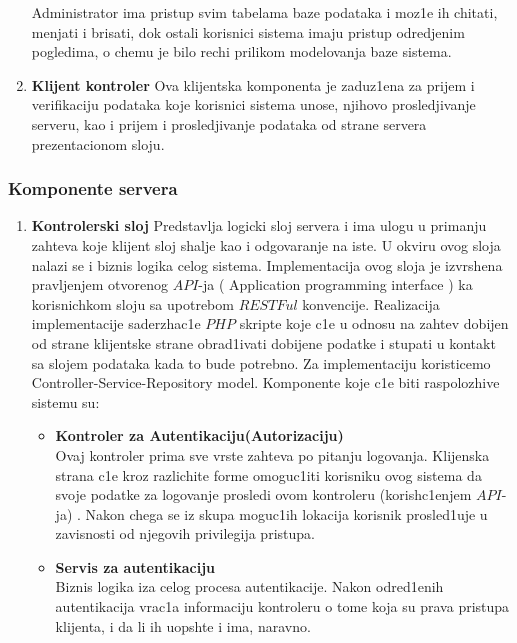\begin{enumerate}
\begin{itemize}
\end{itemize}

Administrator ima pristup svim tabelama baze podataka i moz1e ih chitati, menjati i brisati, dok ostali korisnici sistema imaju pristup odredjenim pogledima, o chemu je bilo rechi prilikom modelovanja baze sistema.
 \item \textbf{Klijent kontroler}
 Ova klijentska komponenta je zaduz1ena za prijem i verifikaciju podataka koje korisnici sistema unose, njihovo prosledjivanje serveru, kao i prijem i prosledjivanje podataka od strane servera prezentacionom sloju. 
\end{enumerate}
\subsubsection{Komponente servera}
\begin{enumerate}
    \item {\textbf{Kontrolerski sloj}}
			Predstavlja logicki sloj servera i ima ulogu u primanju zahteva koje klijent sloj shalje kao i odgovaranje na iste. U okviru ovog sloja nalazi se i biznis logika celog sistema.  Implementacija ovog sloja je izvrshena pravljenjem otvorenog $API$-ja ( \selectfont Application programming interface  \selectfont ) ka korisnichkom sloju sa upotrebom $RESTFul$ konvencije. Realizacija implementacije saderzhac1e $PHP$ skripte koje c1e u odnosu na zahtev dobijen od strane klijentske strane obrad1ivati dobijene podatke i stupati u kontakt sa slojem podataka kada to bude potrebno. Za implementaciju koristicemo  \selectfont Controller-Service-Repository \selectfont  model.  Komponente koje c1e biti raspolozhive sistemu su:
			\begin{itemize}
				\item {\textbf{Kontroler za Autentikaciju(Autorizaciju)} \\
						Ovaj kontroler prima sve vrste zahteva po pitanju logovanja. Klijenska strana c1e kroz razlichite forme omoguc1iti korisniku ovog sistema da svoje podatke za logovanje prosledi ovom kontroleru (korish\-c1enjem $API$-ja) . Nakon chega se iz skupa moguc1ih lokacija korisnik prosled1uje u zavisnosti od njegovih privilegija pristupa.}
				\item{\textbf{Servis za autentikaciju}\\
				Biznis logika iza celog procesa autentikacije. Nakon odred1enih autentikacija vrac1a informaciju kontroleru o tome koja su prava pristupa klijenta, i da li ih uopshte i ima, naravno.}

\end{itemize}
\end{enumerate}
